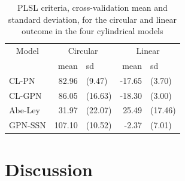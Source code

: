 \documentclass[man]{apa6}
\theoremstyle{definition}
\theoremstyle{definition}
\theoremstyle{definition}
\theoremstyle{remark}
\begin{document}
\begin{table}

\caption{\label{tab:ModelFit}PLSL criteria, cross-validation mean and standard deviation, for the circular and linear outcome in the four cylindrical models}
\centering
\begin{tabular}[t]{lrlrl}
\toprule
\multicolumn{1}{c}{Model} & \multicolumn{2}{c}{Circular} & \multicolumn{2}{c}{Linear} \\
\cmidrule(l{2pt}r{2pt}){1-1} \cmidrule(l{2pt}r{2pt}){2-3} \cmidrule(l{2pt}r{2pt}){4-5}
  & mean & sd & mean & sd\\
\midrule
CL-PN & 82.96 & (9.47) & -17.65 & (3.70)\\
CL-GPN & 86.05 & (16.63) & -18.30 & (3.00)\\
Abe-Ley & 31.97 & (22.07) & 25.49 & (17.46)\\
GPN-SSN & 107.10 & (10.52) & -2.37 & (7.01)\\
\bottomrule
\end{tabular}
\end{table}

\section{Discussion}\label{Discussion}
\end{document}
